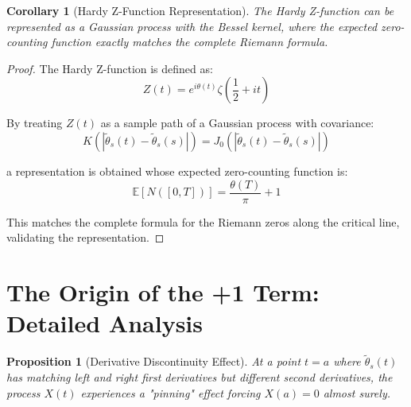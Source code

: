 \documentclass{article}
\newtheorem{proposition}[theorem]{Proposition}
\newtheorem{corollary}[theorem]{Corollary}
\theoremstyle{definition}
\begin{document}
\begin{corollary}[Hardy Z-Function Representation]
The Hardy Z-function can be represented as a Gaussian process with the Bessel kernel, where the expected zero-counting function exactly matches the complete Riemann formula.
\end{corollary}

\begin{proof}
The Hardy Z-function is defined as:
\begin{equation}
Z(t) = e^{i\theta(t)}\zeta\left(\frac{1}{2} + it\right)
\end{equation}

By treating $Z(t)$ as a sample path of a Gaussian process with covariance:
\begin{equation}
K(|\tilde{\theta}_s(t) - \tilde{\theta}_s(s)|) = J_0(|\tilde{\theta}_s(t) - \tilde{\theta}_s(s)|)
\end{equation}

a representation is obtained whose expected zero-counting function is:
\begin{equation}
\mathbb{E}[N([0,T])] = \frac{\theta(T)}{\pi} + 1
\end{equation}

This matches the complete formula for the Riemann zeros along the critical line, validating the representation.
\end{proof}

\section{The Origin of the +1 Term: Detailed Analysis}

\begin{proposition}[Derivative Discontinuity Effect]
At a point $t = a$ where $\tilde{\theta}_s(t)$ has matching left and right first derivatives but different second derivatives, the process $X(t)$ experiences a "pinning" effect forcing $X(a) = 0$ almost surely.
\end{proposition}
\end{document}
